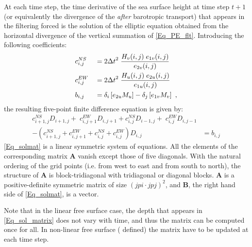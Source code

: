 At each time step, the time derivative of the sea surface height at time step $t+1$ 
(or equivalently the divergence of the \textit{after} barotropic transport) that appears 
in the filtering forced is the solution of the elliptic equation obtained from the horizontal 
divergence of the vertical summation of \eqref{Eq_PE_flt}. 
Introducing the following coefficients:
\begin{equation}  \label{Eq_sol_matrix}
\begin{aligned}
&c_{i,j}^{NS}  &&= {2 \Delta t }^2 \; \frac{H_v (i,j) \; e_{1v} (i,j)}{e_{2v}(i,j)}              \\
&c_{i,j}^{EW} &&= {2 \Delta t }^2 \; \frac{H_u (i,j) \; e_{2u} (i,j)}{e_{1u}(i,j)}            \\
&b_{i,j} &&= \delta_i \left[ e_{2u}M_u \right] - \delta_j \left[ e_{1v}M_v \right]\ ,   \\
\end{aligned}
\end{equation}
the resulting five-point finite difference equation is given by:
\begin{equation}  \label{Eq_solmat}
\begin{split}
       c_{i+1,j}^{NS} D_{i+1,j}  + \;  c_{i,j+1}^{EW} D_{i,j+1}   
  +   c_{i,j}    ^{NS} D_{i-1,j}   + \;  c_{i,j}    ^{EW} D_{i,j-1}                                          &    \\
  -    \left(c_{i+1,j}^{NS} + c_{i,j+1}^{EW} + c_{i,j}^{NS} + c_{i,j}^{EW} \right)   D_{i,j}  &=  b_{i,j}
\end{split}
\end{equation}
\eqref{Eq_solmat} is a linear symmetric system of equations. All the elements of 
the corresponding matrix \textbf{A} vanish except those of five diagonals. With 
the natural ordering of the grid points (i.e. from west to east and from 
south to north), the structure of \textbf{A} is block-tridiagonal with 
tridiagonal or diagonal blocks. \textbf{A} is a positive-definite symmetric 
matrix of size $(jpi \cdot jpj)^2$, and \textbf{B}, the right hand side of 
\eqref{Eq_solmat}, is a vector.

Note that in the linear free surface case, the depth that appears in \eqref{Eq_sol_matrix}
does not vary with time, and thus the matrix can be computed once for all. In non-linear free surface 
( defined) the matrix have to be updated at each time step.


